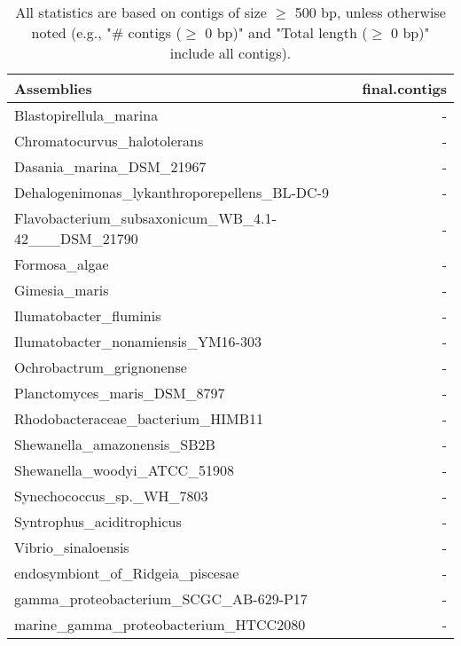 \documentclass[12pt,a4paper]{article}
\begin{document}
\begin{table}[ht]
\begin{center}
\caption{All statistics are based on contigs of size $\geq$ 500 bp, unless otherwise noted (e.g., "\# contigs ($\geq$ 0 bp)" and "Total length ($\geq$ 0 bp)" include all contigs).}
\begin{tabular}{|l*{1}{|r}|}
\hline
Assemblies & final.contigs \\ \hline
Blastopirellula\_marina & - \\ \hline
Chromatocurvus\_halotolerans & - \\ \hline
Dasania\_marina\_DSM\_21967 & - \\ \hline
Dehalogenimonas\_lykanthroporepellens\_BL-DC-9 & - \\ \hline
Flavobacterium\_subsaxonicum\_WB\_4.1-42\_\_\_DSM\_21790 & - \\ \hline
Formosa\_algae & - \\ \hline
Gimesia\_maris & - \\ \hline
Ilumatobacter\_fluminis & - \\ \hline
Ilumatobacter\_nonamiensis\_YM16-303 & - \\ \hline
Ochrobactrum\_grignonense & - \\ \hline
Planctomyces\_maris\_DSM\_8797 & - \\ \hline
Rhodobacteraceae\_bacterium\_HIMB11 & - \\ \hline
Shewanella\_amazonensis\_SB2B & - \\ \hline
Shewanella\_woodyi\_ATCC\_51908 & - \\ \hline
Synechococcus\_sp.\_WH\_7803 & - \\ \hline
Syntrophus\_aciditrophicus & - \\ \hline
Vibrio\_sinaloensis & - \\ \hline
endosymbiont\_of\_Ridgeia\_piscesae & - \\ \hline
gamma\_proteobacterium\_SCGC\_AB-629-P17 & - \\ \hline
marine\_gamma\_proteobacterium\_HTCC2080 & - \\ \hline
\end{tabular}
\end{center}
\end{table}
\end{document}
